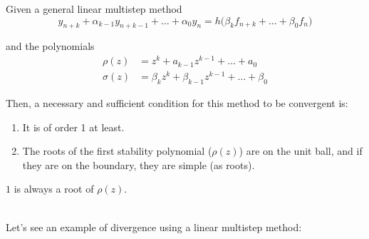 \begin{theorem}
  Given a general linear multistep method $$y_{n+k} + \alpha_{k-1}y_{n+k-1} + \ldots + \alpha_0y_n = h\big(\beta_kf_{n+k}+\ldots+\beta_0f_n \big)$$ 
  
  and the polynomials
  \begin{align*}
      \rho(z)   &= z^k + a_{k-1}z^{k-1} + \ldots + a_0\\
      \sigma(z) &= \beta_kz^k + \beta_{k-1}z^{k-1} + \ldots + \beta_0
  \end{align*}
  
  Then, a necessary and sufficient condition for this method to be convergent is:
  \begin{enumerate}
      \item It is of order 1 at least.
      \item The roots of the first stability polynomial ($\rho(z)$) are on the unit ball, and if they are on the boundary, they are simple (as roots).
  \end{enumerate}
\end{theorem}

\begin{remark}
  $1$ is always a root of $\rho(z)$.
\end{remark}
\-\\
Let's see an example of divergence using a linear multistep method:

